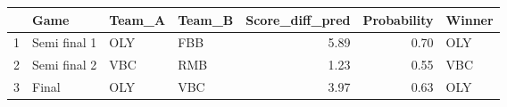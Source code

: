 \begin{table}[ht]
\centering
\begin{tabular}{rlllrrl}
  \hline
 & Game & Team\_A & Team\_B & Score\_diff\_pred & Probability & Winner \\ 
  \hline
1 & Semi final 1 & OLY & FBB & 5.89 & 0.70 & OLY \\ 
  2 & Semi final 2 & VBC & RMB & 1.23 & 0.55 & VBC \\ 
  3 & Final & OLY & VBC & 3.97 & 0.63 & OLY \\ 
   \hline
\end{tabular}
\end{table}
